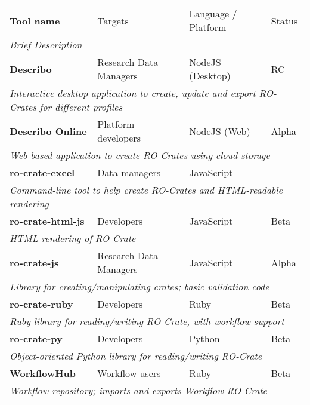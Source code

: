 
\begin{table}[htbp]
	\centering
	\begin{tabular}{llll}
		\toprule
		\textbf{Tool name} & Targets & Language / Platform & Status \\
		\multicolumn{4}{l}{\it Brief Description} \\
		\midrule
		
		\textbf{Describo} \citep{describo} & Research Data Managers & NodeJS (Desktop) & RC \\
		\multicolumn{4}{l}{\it Interactive desktop application to create, update and export RO-Crates for different profiles} \\
		
		\textbf{Describo Online} \citep{describo-online} & Platform developers & NodeJS (Web) & Alpha \\
		\multicolumn{4}{l}{\it Web-based application to create RO-Crates using cloud storage} \\
		
		\textbf{ro-crate-excel} \citep{ro-crate-excel} & Data managers & JavaScript \\
		\multicolumn{4}{l}{\it Command-line tool to help create RO-Crates and HTML-readable rendering} \\
		
		\textbf{ro-crate-html-js} \citep{ro-crate-html-js} & Developers & JavaScript & Beta \\
		\multicolumn{4}{l}{\it HTML rendering of RO-Crate}  \\
		
		\textbf{ro-crate-js} \citep{ro-crate-js} & Research Data Managers & JavaScript & Alpha \\
		\multicolumn{4}{l}{\it Library for creating/manipulating crates; basic validation code} \\
		
		\textbf{ro-crate-ruby} \citep{ro-crate-ruby} & Developers & Ruby & Beta \\
		\multicolumn{4}{l}{\it Ruby library for reading/writing RO-Crate, with workflow support} \\
		
		\textbf{ro-crate-py} \citep{ro-crate-py} & Developers & Python & Beta \\
		\multicolumn{4}{l}{\it Object-oriented Python library for reading/writing RO-Crate} \\
		
		\textbf{WorkflowHub} \citep{about-workflowhub} & Workflow users & Ruby & Beta \\
		\multicolumn{4}{l}{\it Workflow repository; imports and exports Workflow RO-Crate} \\
		

\end{tabular}
\end{table}
